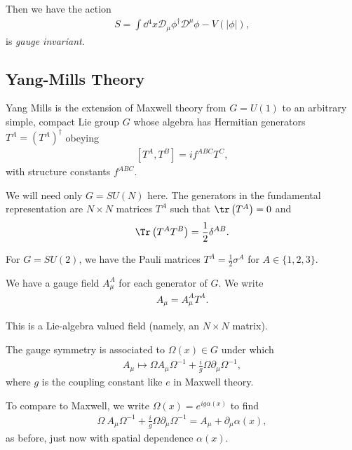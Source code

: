 Then we have the action
\begin{align}
    S = \int \dd{^{4}x} \mathcal{D}_\mu \phi^{\dag} \mathcal{D}^{\mu} \phi - V \left( \left| \phi \right|  \right)
,\end{align}
is \emph{gauge invariant}.

\subsection{Yang-Mills Theory}

Yang Mills is the extension of Maxwell theory from $G = U\left( 1 \right) $ to an arbitrary simple, compact Lie group $G$ whose algebra has Hermitian generators $T^{A} = \left( T^{A} \right)^{\dag}$ obeying
\begin{align}
    \left[ T^{A}, T^{B} \right] = i f^{ABC} T^{C}
,\end{align}
with structure constants $f^{ABC}$.

We will need only $G = SU\left( N \right) $ here. The generators in the fundamental representation are $N \times N$ matrices $T^{A}$ such that $\tr \left( T^{A} \right) = 0$ and 
\begin{align}
    \Tr \left( T^{A} T^{B} \right) = \frac{1}{2} \delta^{AB}
.\end{align}

\begin{example}
    For $G = SU \left( 2 \right) $, we have the Pauli matrices $T^{A} = \frac{1}{2} \sigma^{A}$ for $A \in \{1,2,3\} $.
\end{example}


We have a gauge field $A_\mu^{A}$ for each generator of $G$. We write
\begin{align}
    A_\mu = A_\mu^{A} T^{A}
.\end{align}

This is a Lie-algebra valued field (namely, an $N\times N$ matrix).

The gauge symmetry is associated to $\Omega \left( x \right) \in G$ under which
\begin{align}
    A_\mu \mapsto \Omega A_\mu \Omega^{-1} + \frac{i}{g} \Omega \partial_\mu \Omega^{-1}
,\end{align}
where $g$ is the coupling constant like $e$ in Maxwell theory.

To compare to Maxwell, we write $\Omega \left( x \right) = e^{i g \alpha \left( x \right) }$ to find
\begin{align}
    \Omega \ A_\mu \Omega^{-1} + \frac{i}{g} \Omega \partial_\mu \Omega^{-1} = A_\mu + \partial_\mu \alpha \left( x \right) 
,\end{align}
as before, just now with spatial dependence $\alpha \left( x \right) $.










